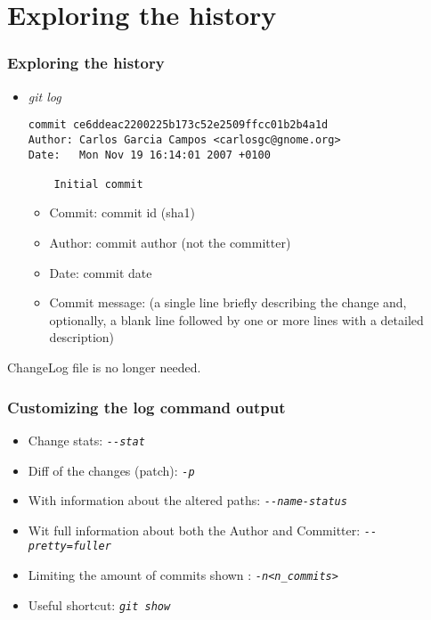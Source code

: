 \section{Exploring the history}

\begin{frame}[fragile]
  \frametitle{Exploring the history}

  \begin{itemize}
  \item {\it git log}
    {\scriptsize
\begin{verbatim}
commit ce6ddeac2200225b173c52e2509ffcc01b2b4a1d
Author: Carlos Garcia Campos <carlosgc@gnome.org>
Date:   Mon Nov 19 16:14:01 2007 +0100

    Initial commit
\end{verbatim}
    }


    \begin{itemize}
    \item Commit: commit id (sha1)
    \item Author: commit author (not the committer)
    \item Date: commit date
    \item Commit message: (a single line briefly 
      describing the change and, optionally, a blank line followed by
      one or more lines with a detailed description)
    \end{itemize}
  \end{itemize}

  ChangeLog file is no longer needed. 

\end{frame}

\begin{frame}[fragile]
  \frametitle{Customizing the log command output}

  \begin{itemize}

  \item Change stats: {\scriptsize{\it \verb|--stat|}}
  \item Diff of the changes (patch): {\scriptsize{\it \verb|-p|}}
  \item With information about the altered paths: {\scriptsize{\it \verb|--name-status|}}
  \item Wit full information about both the Author and Committer: {\scriptsize{\it \verb|--pretty=fuller|}}
  \item Limiting the amount of commits shown : {\scriptsize{\it \verb|-n<n_commits>|}}
  \item Useful shortcut: {\scriptsize{\it \verb|git show|}}
  \end{itemize}

\end{frame}

